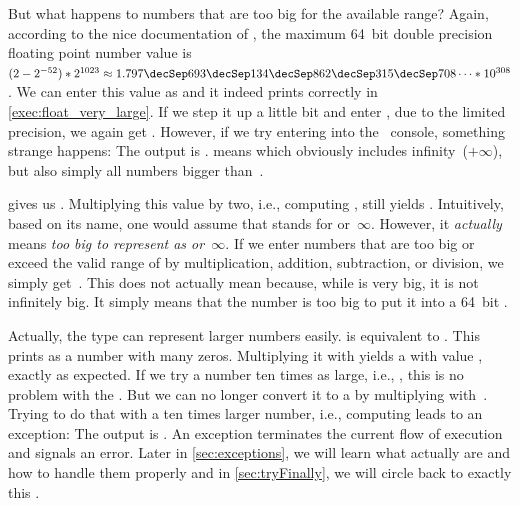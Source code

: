 But what happens to numbers that are too big for the available range?
Again, according to the nice documentation of , the maximum 64~bit double precision floating point number value is~$(2-2^{-52})*2^{1023}\approx1.797\decSep693\decSep134\decSep862\decSep315\decSep708\dots*10^{308}$.
We can enter this value as  and it indeed prints correctly in \cref{exec:float_very_large}.
If we step it up a little bit and enter , due to the limited precision, we again get .
However, if we try entering  into the \python\ console, something strange happens:
The output is .
 means \emph{} which obviously includes infinity~($+\infty$), but also simply all numbers bigger than~.%
%
\begin{sloppypar}%
 gives us .
Multiplying this value by two, i.e., computing , still yields .
Intuitively, based on its name, one would assume that  stands for  or~$\infty$.
However, it \emph{actually} means \emph{too big to represent as  or~$\infty$}.
If we enter numbers that are too big or exceed the valid range of  by multiplication, addition, subtraction, or division, we simply get~.
This does not actually mean  because, while  is very big, it is not infinitely big.
It simply means that the number is too big to put it into a 64~bit .%
\end{sloppypar}%
%
Actually, the  type can represent larger numbers easily.
 is equivalent to .
This prints as a number with many zeros.
Multiplying it with  yields a  with value , exactly as expected.
If we try a number ten times as large, i.e., , this is no problem with the .
But we can no longer convert it to a  by multiplying with~.
Trying to do that with a ten times larger number, i.e., computing  leads to an exception:
The output is .
An exception terminates the current flow of execution and signals an error.
Later in \cref{sec:exceptions}, we will learn what  actually are and how to handle them properly and in \cref{sec:tryFinally}, we will circle back to exactly this .

